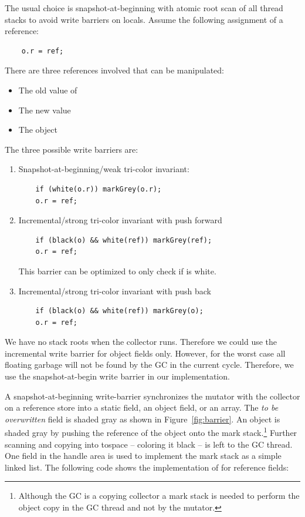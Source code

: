 The usual choice is snapshot-at-beginning with atomic root scan of
all thread stacks to avoid write barriers on locals. Assume the
following assignment of a reference:
\begin{lstlisting}
    o.r = ref;
\end{lstlisting}
There are three references involved that can be manipulated:
\begin{itemize}
    \item The old value of 
    \item The new value 
    \item The object 
\end{itemize}
The three possible write barriers are:
\begin{enumerate}
    \item
Snapshot-at-beginning/weak tri-color invariant:
\begin{lstlisting}
    if (white(o.r)) markGrey(o.r);
    o.r = ref;
\end{lstlisting}
    \item
Incremental/strong tri-color invariant with push forward
\begin{lstlisting}
    if (black(o) && white(ref)) markGrey(ref);
    o.r = ref;
\end{lstlisting}
This barrier can be optimized to only check if  is white.

    \item
Incremental/strong tri-color invariant with push back
\begin{lstlisting}
    if (black(o) && white(ref)) markGrey(o);
    o.r = ref;
\end{lstlisting}

\end{enumerate}

We have no stack roots when the collector runs. Therefore we could
use the incremental write barrier for object fields only. However,
for the worst case all floating garbage will not be found by the GC
in the current cycle. Therefore, we use the snapshot-at-begin write
barrier in our implementation.

A snapshot-at-beginning write-barrier synchronizes the mutator with
the collector on a reference store into a static field, an object
field, or an array. The \emph{to be overwritten} field is shaded gray
as shown in Figure~\ref{fig:barrier}. An object is shaded gray by
pushing the reference of the object onto the mark
stack.\footnote{Although the GC is a copying collector a mark stack
is needed to perform the object copy in the GC thread and not by the
mutator.} Further scanning and copying into tospace -- coloring it
black -- is left to the GC thread. One field in the handle area is
used to implement the mark stack as a simple linked list. The
following code shows the implementation of  for
reference fields:

